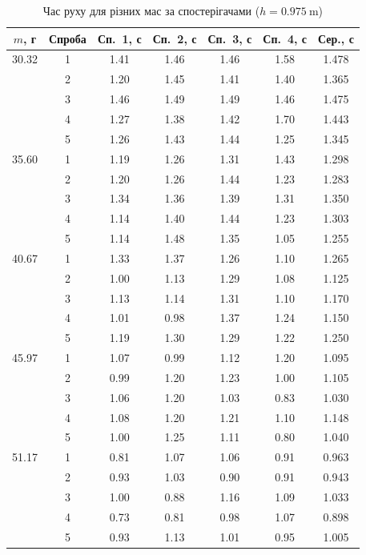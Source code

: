 \documentclass[ukrainian]{ucaphyslab}
\begin{document}
\begin{table}[H]
  \centering
  \small
  \begin{tabular}{@{}cc cccc c@{}}
    \toprule
    $m$, г & Спроба & Сп.~1, с & Сп.~2, с & Сп.~3, с & Сп.~4, с & Сер., с \\
    \midrule
    30.32 & 1 & 1.41 & 1.46 & 1.46 & 1.58 & 1.478 \\
     & 2 & 1.20 & 1.45 & 1.41 & 1.40 & 1.365 \\
     & 3 & 1.46 & 1.49 & 1.49 & 1.46 & 1.475 \\
     & 4 & 1.27 & 1.38 & 1.42 & 1.70 & 1.443 \\
     & 5 & 1.26 & 1.43 & 1.44 & 1.25 & 1.345 \\
    \midrule
    35.60 & 1 & 1.19 & 1.26 & 1.31 & 1.43 & 1.298 \\
     & 2 & 1.20 & 1.26 & 1.44 & 1.23 & 1.283 \\
     & 3 & 1.34 & 1.36 & 1.39 & 1.31 & 1.350 \\
     & 4 & 1.14 & 1.40 & 1.44 & 1.23 & 1.303 \\
     & 5 & 1.14 & 1.48 & 1.35 & 1.05 & 1.255 \\
    \midrule
    40.67 & 1 & 1.33 & 1.37 & 1.26 & 1.10 & 1.265 \\
     & 2 & 1.00 & 1.13 & 1.29 & 1.08 & 1.125 \\
     & 3 & 1.13 & 1.14 & 1.31 & 1.10 & 1.170 \\
     & 4 & 1.01 & 0.98 & 1.37 & 1.24 & 1.150 \\
     & 5 & 1.19 & 1.30 & 1.29 & 1.22 & 1.250 \\
    \midrule
    45.97 & 1 & 1.07 & 0.99 & 1.12 & 1.20 & 1.095 \\
     & 2 & 0.99 & 1.20 & 1.23 & 1.00 & 1.105 \\
     & 3 & 1.06 & 1.20 & 1.03 & 0.83 & 1.030 \\
     & 4 & 1.08 & 1.20 & 1.21 & 1.10 & 1.148 \\
     & 5 & 1.00 & 1.25 & 1.11 & 0.80 & 1.040 \\
    \midrule
    51.17 & 1 & 0.81 & 1.07 & 1.06 & 0.91 & 0.963 \\
     & 2 & 0.93 & 1.03 & 0.90 & 0.91 & 0.943 \\
     & 3 & 1.00 & 0.88 & 1.16 & 1.09 & 1.033 \\
     & 4 & 0.73 & 0.81 & 0.98 & 1.07 & 0.898 \\
     & 5 & 0.93 & 1.13 & 1.01 & 0.95 & 1.005 \\
    \bottomrule
  \end{tabular}
  \caption{Час руху для різних мас за спостерігачами ($h = \SI{0.975}{\meter}$)}
\end{table}
\end{document}

